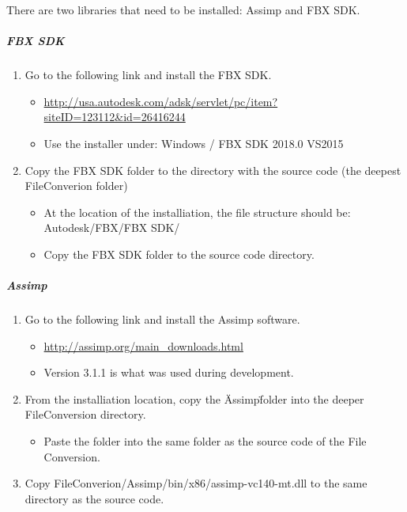 There are two libraries that need to be installed: Assimp and FBX SDK.

\subparagraph{FBX SDK}

\begin{enumerate}
    \item Go to the following link and install the FBX SDK.
    \begin{itemize}
        \item \url{http://usa.autodesk.com/adsk/servlet/pc/item?siteID=123112&id=26416244}
        \item Use the installer under: Windows / FBX SDK 2018.0 VS2015
    \end{itemize}

    \item Copy the FBX SDK folder to the directory with the source code (the deepest FileConverion folder)
    \begin{itemize}
        \item At the location of the installiation, the file structure should be: Autodesk/FBX/FBX SDK/
        \item Copy the FBX SDK folder to the source code directory.
    \end{itemize}
\end{enumerate}

\subparagraph{Assimp}

\begin{enumerate}
    \item Go to the following link and install the Assimp software.
    \begin{itemize}
        \item \url{http://assimp.org/main_downloads.html}
        \item Version 3.1.1 is what was used during development.
    \end{itemize}

    \item From the installiation location, copy the \"Assimp\" folder into the deeper FileConversion directory.
    \begin{itemize}
        \item Paste the folder into the same folder as the source code of the File Conversion.
    \end{itemize}

    \item Copy FileConverion/Assimp/bin/x86/assimp-vc140-mt.dll to the same directory as the source code.
\end{enumerate}

